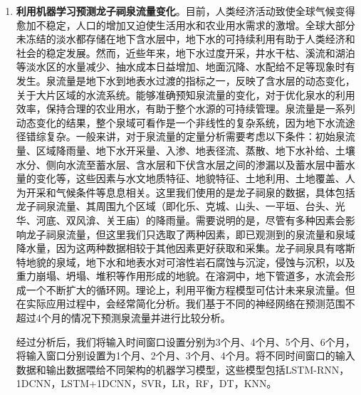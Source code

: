 \begin{enumerate}
    \item \textbf{利用机器学习预测龙子祠泉流量变化}。目前，人类经济活动致使全球气候变得愈加不稳定，人口的增加又迫使生活用水和农业用水需求的激增。全球大部分未冻结的淡水都存储在地下含水层中，地下水的可持续利用有助于人类经济和社会的稳定发展。然而，近些年来，地下水过度开采，井水干枯、溪流和湖泊等淡水区的水量减少、抽水成本日益增加、地面沉降、水配给不足等现象时有发生。泉流量是地下水到地表水过渡的指标之一，反映了含水层的动态变化，关于大片区域的水流系统。能够准确预知泉流量的变化，对于优化泉水的利用效率，保持合理的农业用水，有助于整个水源的可持续管理。泉流量是一系列动态变化的结果，整个泉域可看作是一个非线性的复杂系统，因为地下水流途径错综复杂。一般来讲，对于泉流量的定量分析需要考虑以下条件：初始泉流量、区域降雨量、地下水开采量、入渗、地表径流、蒸散、地下水补给、土壤水分、侧向水流至蓄水层、含水层和下伏含水层之间的渗漏以及蓄水层中蓄水量的变化等，这些因素与水文地质特征、地貌特征、土地利用、土地覆盖、人为开采和气候条件等息息相关。这里我们使用的是龙子祠泉的数据，具体包括龙子祠泉流量、其周围九个区域（即化乐、克城、山头、一平垣、台头、光华、河底、双风渰、关王庙）的降雨量。需要说明的是，尽管有多种因素会影响龙子祠泉流量，但这里我们只选取了两种因素，即已观测到的泉流量和泉域降水量，因为这两种数据相较于其他因素更好获取和采集。龙子祠泉具有喀斯特地貌的泉域，地下水和地表水对可溶性岩石腐蚀与沉淀，侵蚀与沉积，以及重力崩塌、坍塌、堆积等作用形成的地貌。在溶洞中，地下管道多，水流会形成一个不断扩大的循环网。理论上，利用平衡方程模型可估计未来泉流量。但在实际应用过程中，会经常简化分析。我们基于不同的神经网络在预测范围不超过4个月的情况下预测泉流量并进行比较分析。
    
    经过分析后，我们将输入时间窗口设置分别为3个月、4个月、5个月、6个月，将输入窗口分别设置为1个月、2个月、3个月、4个月。将不同时间窗口的输入数据和输出数据喂给不同架构的机器学习模型，这些模型包括LSTM-RNN，1DCNN，LSTM+1DCNN，SVR，LR，RF，DT，KNN。


\end{enumerate}

